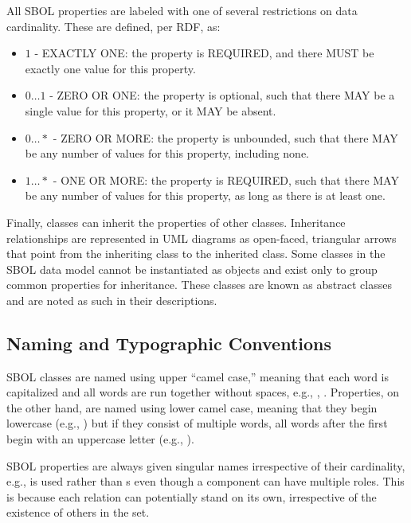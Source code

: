 All SBOL properties are labeled with one of several restrictions on data cardinality. These are defined, per RDF, as:

\begin{itemize}

\item $1$ - EXACTLY ONE: the property is REQUIRED, and there MUST be exactly one value for this property.

\item $0 \ldots 1$ - ZERO OR ONE: the property is optional, such that there MAY be a single value for this property, or it MAY be absent.

\item $0 \ldots *$ - ZERO OR MORE: the property is unbounded, such that there MAY be any number of values for this property, including none.

\item $1 \ldots *$ - ONE OR MORE: the property is REQUIRED, such that there MAY be any number of values for this property, as long as there is at least one.

\end{itemize}

Finally, classes can inherit the properties of other classes. Inheritance relationships are represented in UML diagrams as open-faced, triangular arrows that point from the inheriting class to the inherited class. Some classes in the SBOL data model cannot be instantiated as objects and exist only to group common properties for inheritance.
These classes are known as abstract classes and are noted as such in their descriptions.

\subsection{Naming and Typographic Conventions}
\label{sec:nameconventions}

SBOL classes are named using upper ``camel case,'' meaning that each word is capitalized and all words are run together without spaces, e.g., , .
Properties, on the other hand, are named using lower camel case, meaning that they begin lowercase (e.g., ) but if they consist of multiple words, all words after the first begin with an uppercase letter (e.g., ).

SBOL properties are always given singular names irrespective of their cardinality, e.g.,  is used rather than s even though a component can have multiple roles.
This is because each relation can potentially stand on its own, irrespective of the existence of others in the set.

